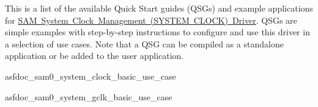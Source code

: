This is a list of the available Quick Start guides (Q\+S\+Gs) and example applications for \mbox{\hyperlink{group__asfdoc__sam0__system__clock__group}{S\+AM System Clock Management (S\+Y\+S\+T\+EM C\+L\+O\+CK) Driver}}. Q\+S\+Gs are simple examples with step-\/by-\/step instructions to configure and use this driver in a selection of use cases. Note that a Q\+SG can be compiled as a standalone application or be added to the user application.


\begin{DoxyItemize}
\item asfdoc\+\_\+sam0\+\_\+system\+\_\+clock\+\_\+basic\+\_\+use\+\_\+case
\item asfdoc\+\_\+sam0\+\_\+system\+\_\+gclk\+\_\+basic\+\_\+use\+\_\+case 
\end{DoxyItemize}